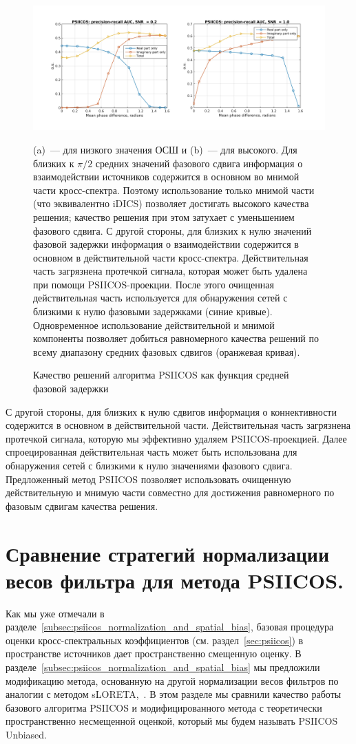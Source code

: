 \begin{figure}[!ht]
 \includegraphics[width=1\textwidth]{../images/psiicos_paper/Figure9_hr.jpg}
 \caption{Качество решений алгоритма PSIICOS как функция средней фазовой задержки}\label{fig:09}
     (a)~--- для низкого значения ОСШ и (b)~--- для высокого.
     Для близких к $\pi/2$ средних значений фазового сдвига информация
     о взаимодействии источников содержится в основном во мнимой части кросс-спектра.
     Поэтому использование только мнимой части (что эквивалентно iDICS) позволяет
     достигать высокого качества решения; качество решения при этом затухает
     с уменьшением фазового сдвига. С другой стороны, для близких к нулю
     значений фазовой задержки информация о взаимодействии содержится в основном
     в действительной части кросс-спектра. Действительная часть загрязнена
     протечкой сигнала, которая может быть удалена при помощи PSIICOS-проекции.
     После этого очищенная действительная часть используется для обнаружения
     сетей с близкими к нулю фазовыми задержками (синие кривые). Одновременное
     использование действительной и мнимой компоненты позволяет добиться равномерного
     качества решений по всему диапазону средних фазовых сдвигов (оранжевая кривая).
\end{figure}%

С другой стороны, для близких к нулю сдвигов информация о коннективности содержится
в основном в действительной части. Действительная часть загрязнена протечкой сигнала, которую
мы эффективно удаляем PSIICOS-проекцией. Далее спроецированная действительная часть
может быть использована для обнаружения сетей с близкими к нулю значениями фазового
сдвига. Предложенный метод PSIICOS позволяет использовать очищенную действительную
и мнимую части совместно для достижения равномерного по фазовым сдвигам качества решения.

\section{Сравнение стратегий нормализации весов фильтра для метода PSIICOS.}
Как мы уже отмечали в разделе~\ref{subsec:psiicos_normalization_and_spatial_bias},
базовая процедура оценки кросс-спектральных коэффициентов (см.
раздел~\ref{sec:psiicos}) в пространстве источников дает пространственно смещенную оценку.
В разделе~\ref{subsec:psiicos_normalization_and_spatial_bias} мы предложили модификацию
метода, основанную на другой нормализации весов фильтров по аналогии с методом sLORETA,~\cite{Pascual-Marqui2002}.
В этом разделе мы сравнили качество работы базового алгоритма PSIICOS и модифицированного метода
с теоретически пространственно несмещенной оценкой, который мы будем называть PSIICOS Unbiased.

